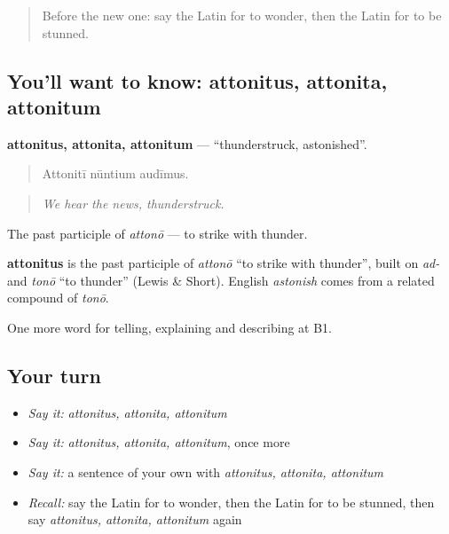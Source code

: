 \label{lesson:LA-C495-attonitus}



\begin{quote}
Before the new one: say the Latin for to wonder, then the Latin for to be stunned.
\end{quote}

\subsection*{You'll want to know: attonitus, attonita, attonitum}
\textbf{attonitus, attonita, attonitum} — \textquotedblleft{}thunderstruck, astonished\textquotedblright{}.

\begin{quote}
Attonitī nūntium audīmus.
\end{quote}

\begin{quote}
\emph{We hear the news, thunderstruck.}
\end{quote}

The past participle of \emph{attonō} — to strike with thunder.

\begin{cousinweb}
\textbf{attonitus} is the past participle of \emph{attonō} \textquotedblleft{}to strike with thunder\textquotedblright{}, built on \emph{ad-} and \emph{tonō} \textquotedblleft{}to thunder\textquotedblright{} (Lewis \& Short). English \emph{astonish} comes from a related compound of \emph{tonō}.
\end{cousinweb}

\begin{grammarlens}[title={What you've built}]
One more word for telling, explaining and describing at B1.
\end{grammarlens}

\subsection*{Your turn}
\begin{itemize}
\raggedright
  \item \emph{Say it:} \emph{attonitus, attonita, attonitum}
  \item \emph{Say it:} \emph{attonitus, attonita, attonitum}, once more
  \item \emph{Say it:} a sentence of your own with \emph{attonitus, attonita, attonitum}
  \item \emph{Recall:} say the Latin for to wonder, then the Latin for to be stunned, then say \emph{attonitus, attonita, attonitum} again
\end{itemize}

